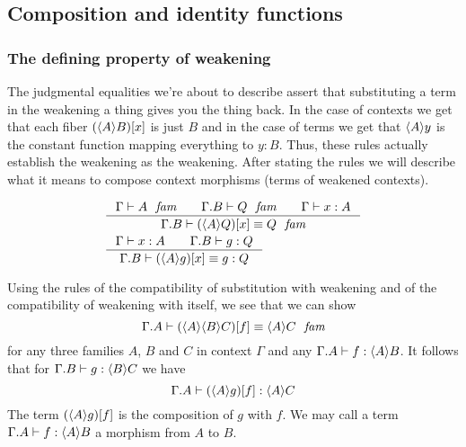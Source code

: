 \subsection{Composition and identity functions}
\subsubsection{The defining property of weakening}
The judgmental equalities we're about to describe assert that substituting a term
in the weakening a thing gives you the thing back. In the case of contexts we get that each fiber
$\subst{x}{\ctxwk{A}{B}}$ is just $B$ and in the case of terms we get 
that $\ctxwk{A}{y}$ is the constant function
mapping everything to $y:B$. Thus, these rules actually establish the weakening
as the weakening. After stating the rules we will describe what it means to
compose context morphisms (terms of weakened contexts).

\begin{align}
& \inference{\jfam{\Gamma}{A}\qquad\jfam{{\Gamma}{B}}{Q}\qquad\jterm{\Gamma}{A}{x}}{\jfameq{{\Gamma}{B}}{\subst{x}{\ctxwk{A}{Q}}}{Q}}\label{defn-ws-3}\\
& \inference{\jterm{\Gamma}{A}{x}\qquad\jterm{{\Gamma}{B}}{Q}{g}}{\jtermeq{{\Gamma}{B}}{Q}{\subst{x}{\ctxwk{A}{g}}}{g}}\label{defn-ws-4}
\end{align}

Using the rules of the compatibility of substitution with weakening and of the
compatibility of weakening with itself, we see that we can show
\begin{equation*}
\jfameq{{\Gamma}{A}}{\subst{f}{\ctxwk{A}{{B}{C}}}}{\ctxwk{A}{C}}
\end{equation*}
for any three families $A$, $B$ and $C$ in context $\Gamma$ and any $\jterm{{\Gamma}{A}}{\ctxwk{A}{B}}{f}$.
It follows that for $\jterm{{\Gamma}{B}}{\ctxwk{B}{C}}{g}$ we have
\begin{equation*}
\jterm{{\Gamma}{A}}{\ctxwk{A}{C}}{\subst{f}{\ctxwk{A}{g}}}
\end{equation*}
The term $\jcomp{A}{f}{g}$ is the composition of $g$ with $f$. We may call
a term $\jterm{{\Gamma}{A}}{\ctxwk{A}{B}}{f}$ a morphism from $A$ to $B$.


